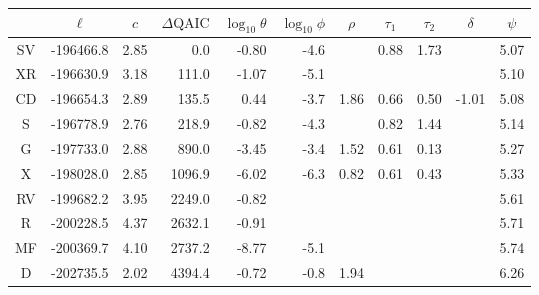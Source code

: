 \begin{tabular}{crrrrrrrrrr}
  \hline
 & \multicolumn{1}{c}{$\ell$} & \multicolumn{1}{c}{$\hat{c}$} & \multicolumn{1}{c}{$\Delta\!\mathrm{QAIC}$} & \multicolumn{1}{c}{$\log_{10}{\theta}$} & \multicolumn{1}{c}{$\log_{10}{\phi}$} & \multicolumn{1}{c}{$\rho$} & \multicolumn{1}{c}{$\tau_1$} & \multicolumn{1}{c}{$\tau_2$} & \multicolumn{1}{c}{$\delta$} & \multicolumn{1}{c}{$\psi$} \\ 
  \hline
SV & -196466.8 & 2.85 & 0.0 & -0.80 & -4.6 &  & 0.88 & 1.73 &  & 5.07 \\ 
  XR & -196630.9 & 3.18 & 111.0 & -1.07 & -5.1 &  &  &  &  & 5.10 \\ 
  CD & -196654.3 & 2.89 & 135.5 & 0.44 & -3.7 & 1.86 & 0.66 & 0.50 & -1.01 & 5.08 \\ 
  S & -196778.9 & 2.76 & 218.9 & -0.82 & -4.3 &  & 0.82 & 1.44 &  & 5.14 \\ 
  G & -197733.0 & 2.88 & 890.0 & -3.45 & -3.4 & 1.52 & 0.61 & 0.13 &  & 5.27 \\ 
  X & -198028.0 & 2.85 & 1096.9 & -6.02 & -6.3 & 0.82 & 0.61 & 0.43 &  & 5.33 \\ 
  RV & -199682.2 & 3.95 & 2249.0 & -0.82 &  &  &  &  &  & 5.61 \\ 
  R & -200228.5 & 4.37 & 2632.1 & -0.91 &  &  &  &  &  & 5.71 \\ 
  MF & -200369.7 & 4.10 & 2737.2 & -8.77 & -5.1 &  &  &  &  & 5.74 \\ 
  D & -202735.5 & 2.02 & 4394.4 & -0.72 & -0.8 & 1.94 &  &  &  & 6.26 \\ 
   \hline
\end{tabular}
